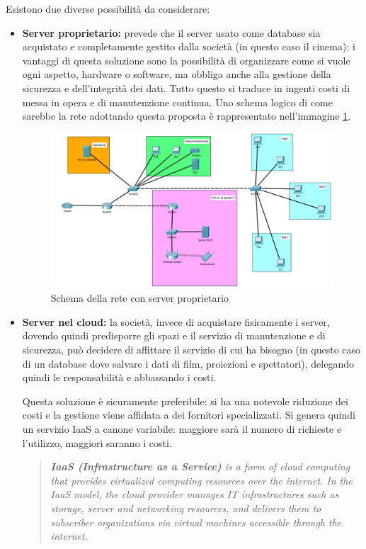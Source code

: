 \documentclass{article}
\begin{document}
Esistono due diverse possibilità da considerare:
\begin{itemize}
    \item \textbf{Server proprietario: }prevede che il server usato come database sia acquistato e completamente gestito dalla società (in questo caso il cinema); i vantaggi di questa soluzione sono la possibilità di organizzare come si vuole ogni aspetto, hardware o software, ma obbliga anche alla gestione della sicurezza e dell'integrità dei dati. Tutto questo si traduce in ingenti costi di messa in opera e di manutenzione continua. Uno schema logico di come sarebbe la rete adottando questa proposta è rappresentato nell'immagine \ref{fig:SchemaDatabaseInterno}.
    \begin{figure}[H]
    \centering
    \includegraphics[width=14cm]{SchemaReteDatabaseInterno.png}
    \caption{Schema della rete con server proprietario}
    \label{fig:SchemaDatabaseInterno}
    \end{figure}
    \item \textbf{Server nel cloud: }la società, invece di acquistare fisicamente i server, dovendo quindi predisporre gli spazi e il servizio di manutenzione e di sicurezza, può decidere di affittare il servizio di cui ha bisogno (in questo caso di un database dove salvare i dati di film, proiezioni e spettatori), delegando quindi le responsabilità e abbassando i costi.
    
    Questa soluzione è sicuramente preferibile: si ha una notevole riduzione dei costi e la gestione viene affidata a dei fornitori specializzati. Si genera quindi un servizio IaaS a canone variabile: maggiore sarà il numero di richieste e l'utilizzo, maggiori saranno i costi.
    
    \begin{quote}
    \begin{Cit}
    \textit{
    \textbf{IaaS (Infrastructure as a Service)} is a form of cloud computing that provides virtualized computing resources over the internet.
    In the IaaS model, the cloud provider manages IT infrastractures such as storage, server and networking resources, and delivers them to subscriber organizations via virtual machines accessible through the internet.}
    \end{Cit}
    \end{quote}
    

\end{itemize}
\end{document}
